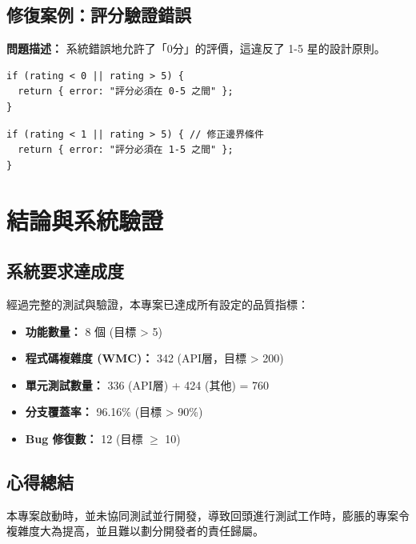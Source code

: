 \documentclass[11pt, a4paper]{article}
\begin{document}
\subsection{修復案例：評分驗證錯誤}

\textbf{問題描述：} 系統錯誤地允許了「0分」的評價，這違反了 1-5 星的設計原則。

\begin{tcolorbox}[colback=CoralRed!10!white, colframe=CoralRed, title=Before (Bug Code)]
  \begin{lstlisting}[numbers=none]
if (rating < 0 || rating > 5) {
  return { error: "評分必須在 0-5 之間" };
}
\end{lstlisting}
\end{tcolorbox}

\begin{tcolorbox}[colback=SuccessGreen!10!white, colframe=SuccessGreen, title=After (Fixed Code)]
  \begin{lstlisting}[numbers=none]
if (rating < 1 || rating > 5) { // 修正邊界條件
  return { error: "評分必須在 1-5 之間" };
}
\end{lstlisting}
\end{tcolorbox}

\section{結論與系統驗證}

\subsection{系統要求達成度}
經過完整的測試與驗證，本專案已達成所有設定的品質指標：

\begin{itemize}[label=\textcolor{SuccessGreen}{$\checkmark$}]
  \item \textbf{功能數量：} 8 個 (目標 > 5)
  \item \textbf{程式碼複雜度 (WMC)：} 342 (API層，目標 > 200)
  \item \textbf{單元測試數量：} 336 (API層) + 424 (其他) = 760
  \item \textbf{分支覆蓋率：} 96.16\% (目標 > 90\%)
  \item \textbf{Bug 修復數：} 12 (目標 $\ge$ 10)
\end{itemize}

\subsection{心得總結}
本專案啟動時，並未協同測試並行開發，導致回頭進行測試工作時，膨脹的專案令複雜度大為提高，並且難以劃分開發者的責任歸屬。
\end{document}
